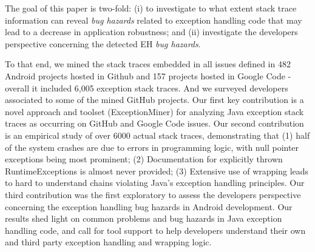 The goal of this paper is two-fold: (i) to investigate 
to what extent stack trace information can reveal \emph{bug hazards} 
related to exception handling code that may lead to a decrease in
application robustness; and (ii) investigate the developers perspective
concerning the detected EH \emph{bug hazards}. 

To that end, we mined the stack 
traces embedded in all issues defined in 482 Android projects hosted in Github and 
157 projects hosted in Google Code - overall it included 6,005
exception stack traces. And we surveyed developers associated to some of 
the mined GitHub projects.
Our first key contribution is
a novel approach and toolset (ExceptionMiner) for analyzing Java
  exception stack traces as occurring on GitHub and Google Code
  issues.
Our second contribution is
an empirical study of over 6000 actual stack traces,
  demonstrating that (1) half of the system crashes are due to errors
  in programming logic, with null pointer exceptions being most
  prominent;
  (2) Documentation for explicitly thrown RuntimeExceptions is almost
  never provided; 
  (3) Extensive use of wrapping leads to hard to understand chains
  violating Java's exception handling principles.
Our third contribution was the first exploratory to assess the 
developers perspective concerning the exception handling 
bug hazards in Android development.
 Our results shed light on common problems and bug hazards in Java
exception handling code, and call for tool support to help developers
understand their own and third party exception handling and wrapping logic.






